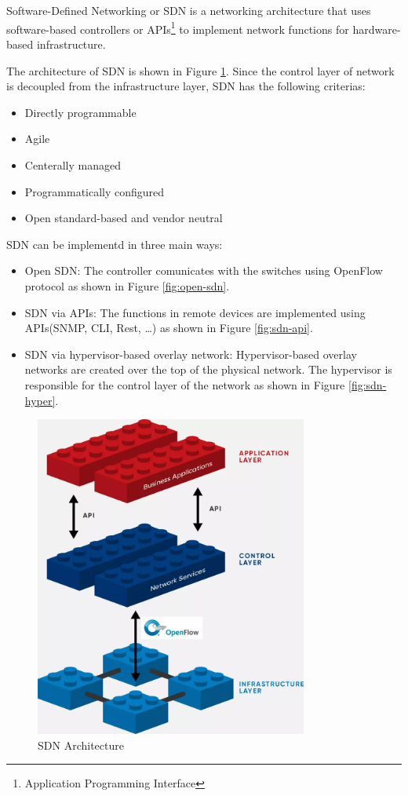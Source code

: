 \documentclass[en]{university}
\begin{document}
\setupdocument

\section{}
Software-Defined Networking or SDN is a networking architecture that uses software-based controllers or APIs\footnote{Application Programming Interface} to implement network functions for hardware-based infrastructure.

The architecture of SDN is shown in Figure \ref{fig:sdn}. Since the control layer of network is decoupled from the infrastructure layer, SDN has the following criterias:
\begin{itemize}
    \item Directly programmable
    \item Agile
    \item Centerally managed
    \item Programmatically configured
    \item Open standard-based and vendor neutral
\end{itemize}
SDN can be implementd in three main ways:
\begin{itemize}
    \item Open SDN: The controller comunicates with the switches using OpenFlow protocol as shown in Figure \ref{fig:open-sdn}.
    \item SDN via APIs: The functions in remote devices are implemented using APIs(SNMP, CLI, Rest, \dots) as shown in Figure \ref{fig:sdn-api}.
    \item SDN via hypervisor-based overlay network: Hypervisor-based overlay networks are created over the top of the physical network. The hypervisor is responsible for the control layer of the network as shown in Figure \ref{fig:sdn-hyper}.
\end{itemize}
\begin{figure}
    \centering
    \includegraphics[width=0.8\textwidth]{resources/sdn-architecture-img.png}
    \caption{SDN Architecture}
    \label{fig:sdn}
\end{figure}
\end{document}
